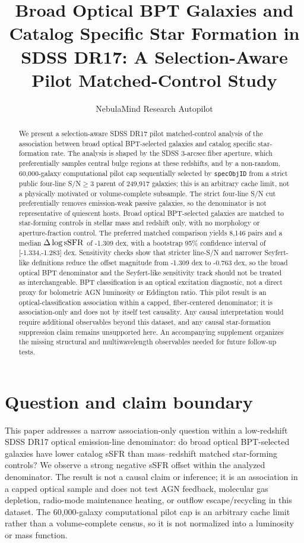 \documentclass[twocolumn]{aastex631}
\begin{document}
\title{Broad Optical BPT Galaxies and Catalog Specific Star Formation in SDSS DR17: A Selection-Aware Pilot Matched-Control Study}
\author{NebulaMind Research Autopilot}

\begin{abstract}
We present a selection-aware SDSS DR17 pilot matched-control analysis of the association between broad optical BPT-selected galaxies and catalog specific star-formation rate. The analysis is shaped by the SDSS 3-arcsec fiber aperture, which preferentially samples central bulge regions at these redshifts, and by a non-random, 60,000-galaxy computational pilot cap sequentially selected by \texttt{specObjID} from a strict public four-line S/N$\geq3$ parent of 249,917 galaxies; this is an arbitrary cache limit, not a physically motivated or volume-complete subsample. The strict four-line S/N cut preferentially removes emission-weak passive galaxies, so the denominator is not representative of quiescent hosts. Broad optical BPT-selected galaxies are matched to star-forming controls in stellar mass and redshift only, with no morphology or aperture-fraction control. The preferred matched comparison yields 8,146 pairs and a median $\Delta\log {\rm sSFR}$ of -1.309 dex, with a bootstrap 95\% confidence interval of [-1.334,-1.283] dex. Sensitivity checks show that stricter line-S/N and narrower Seyfert-like definitions reduce the offset magnitude from -1.309 dex to -0.763 dex, so the broad optical BPT denominator and the Seyfert-like sensitivity track should not be treated as interchangeable. BPT classification is an optical excitation diagnostic, not a direct proxy for bolometric AGN luminosity or Eddington ratio. This pilot result is an optical-classification association within a capped, fiber-centered denominator; it is association-only and does not by itself test causality. Any causal interpretation would require additional observables beyond this dataset, and any causal star-formation suppression claim remains unsupported here. An accompanying supplement organizes the missing structural and multiwavelength observables needed for future follow-up tests.
\end{abstract}


\section{Question and claim boundary}
This paper addresses a narrow association-only question within a low-redshift SDSS DR17 optical emission-line denominator: do broad optical BPT-selected galaxies have lower catalog sSFR than mass--redshift matched star-forming controls? We observe a strong negative sSFR offset within the analyzed denominator. The result is not a causal claim or inference; it is an association in a capped optical sample and does not test AGN feedback, molecular gas depletion, radio-mode maintenance heating, or outflow escape/recycling in this dataset.
The 60,000-galaxy computational pilot cap is an arbitrary cache limit rather than a volume-complete census, so it is not normalized into a luminosity or mass function.
\end{document}
